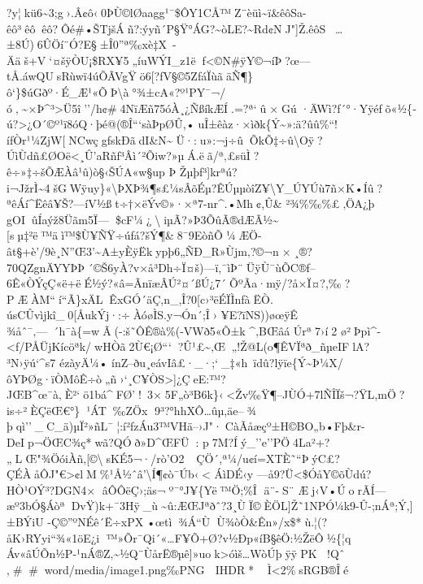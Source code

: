 ?y¦kü6\textasciitilde3;g›.Â¢ô‹0ÞÙ©l­Øaagg¹¯\$ÔY1CÅ™Z¨èüì\textasciitilde ï\&êôSa-êô³ êô\textbarêô?Ôé\#•ŠTjšÁñ?:ýyñ´P§Ÿ°ÁG?\textasciitilde òLE?\textasciitilde Rd¢NJ"{]}Ž.êôS\ldots±8Ú)6ÛÖí¨Ó?E§±Î0''ª‰xè‡X~-Ääš+V`¤šÿÒU¡\$RX¥5„íuWÝI\_z1ëf\textless©N\#ÿY©¬íÞ?œ---tÅ.áwQUsRù\textquotesingle wï4úÕÃVgŸö6{[}?ƒV§©5ZƒáÏùãäÑ¶\}ô`\}\$úGðº·É\_Æ¹«ÕÞ\textbackslash à°¾±\textbar cA«?º¹PY¯¬/ó‚\textasciitilde×Þ\^{}³\textgreater Ü5î''/h¢\#4NïÆñ75óÀ¸¿Ñ­ßík­ÆÍ.=?ª`û×Gú
·ÄWì?f´°·Yÿéƒõ«½\{­ú?\textgreater¿O´©º¹ï8óQ·þé@(®Î```sàÞpØÛ,•uÎ±êàz·×ìðk\{Ý\textasciitilde»:ä?ûû\%``!íƒÒr¹¼ZjW{[}NCwçgfskÐãdI\&N\textasciitildeÜ·:u»:¬j÷û­ÕkÕ‡÷û\textbackslash Oÿ?ÚìÙdñ£ØOë\textless¸Û'aRñƒ³Âì´²Õiw?»µÁ.ëã/ª‚ £süÌ?ê÷»‡÷šÕÆÀâ¹û)ò§‹ŠÚA«w§up
Þ
Žµþf³{]}krªú?i¬JžrÌ\textasciitilde4šGWÿuy\}«\textbackslash ÞXÞ¾¶s£¼s­ÂõÉµ­?ÊÚµµòîZ¥\textbackslash Y\_ÚYÚù7ñ×K•Íû?ªêÁí\^{}Ëêâ¥Š?---íV½ßt÷†×ëÝv©»·×ª7-nr\^{}.•Mh¢,Û\&
²¾\%‰\%£‚ÖA¿þ
gOIûÍaýž8Üãm5Ï---\$cF¼¿\textbackslashiµÃ?»Þ3ÕûÃ®dÆÃ½\textasciitilde{[}\textbar sµ‡²ë™äì™\$Ù¥ÑŸ÷úƒá?šÝ¶\&8¯9EòñÕ¼Æ­Ö-ât§+è'/9è¸N''Œ3'\textasciitilde A±yÈÿËkypþ6„ÑÐ\_R»Ùjm‚?©¬­­n×¸®?70QZgnÄYYÞÞ´©Š6yÀ?v×å³Dh÷Ï¤š)---ï,¯ìÞ¨ÜÿÙ¯ùÕC®f--6Ê«ÒÝçÇ«ë+ëÉ½ý?«â=ÃnïæÂÚ²¤´ßÚ¿7´ÕºÃa·mÿ/?å×Ï¤­?,‰?P\textquotesingle ÆÀM``í``Ã\}xÄLÊxGÓ´äÇ,n\_,Î?0{[}c›³ëÉÏÌnfàËÒ.
úsCÛvìjkî\_0{[}ÅukÝj·:÷\textquotesingleÀóøÌS.y¬Ón´;Î›¥E?ïN­S))øœÿÊ
¾åˆ¯‚---~´h¯à\{=wÃ(-:š˜ÔÊ®­à\%(-VWð5«Õ±k \^{}‚BŒâá Úrª7›í2
ø²Þpì\^{}­\textless ƒ/PÅÜjKícöªk/wHÒã2Ù€¡Ø``` ?Û¹ £\textasciitilde‚Œ„\textbar!Ž@L(o¶ÊVÏªð\_ñµeIFlA?³N›ÿú`\^{}s7
ézàyÄ¼•
ínZ--ðu¸eávIâ£·\_·;`\_‡\textbar«h~ïdû?lÿïe\{Ý\textasciitilde Þ¼X/ôYÞØg·ïÒMôÊ÷ò„ñ›`¸C¥ÒS\textgreater{]}¿ÇeE:™?JŒB\^{}œ¯à‚È²`ö1bá\^{}F\textbar Ø'!~3×5F„ò³B6k\}‹\textless Žv‰Ÿ¶--JÙÓ+7 lÑÎÏš¬?ŸL,m­Ö?is÷²ÈÇëŒ€°\}¹ÁT‰ZÖx
9³?°hhXÔ\ldots ûµ,äe--¾
þqì''\_ C\_ä)µÏ²»ñL¯¦:í²fzÁu3™VHä--›J"·CàÃåæçº±H©BO„b•F­þ\&r-DeIp¬ÖŒC¾ç*wã?QÓð»D\^{}ŒFÜ:
p7M?Íý\_''e''PÖ4La²+?„LŒ"¾ÖóiÀñ‚{[}©\textbackslashs\textbar KÉ5¬·/rò'O2~ÇÖ´,ª¼/u¢í=\textquotesingle XTÈ˜``ÞýC£?ÇÉÀåÔJ"€\textgreater¢lM\%¹Å½ˆâ'\textbackslash Í¶¢ò¯Úb‹\textless{}
ÁìDÉ‹y ---å9?Ü\textless\$ÓåY©õÙdú?HÒ¹OÝ³?DGN4× âÔÔëÇ›;äs¬º¯°J¥\{Yë™Ö­;\%Î
ä¨-S¨
Æj‹V•ÚorÃÍ---æº3bÓ§ÁòªDvŸ)k+¯3Hÿ\_ù\textasciitilde û:ÆŒJªðˆ?3¸ÙÏ©ÈÖL{]}Ž˜1NPÓ¼k9-Û-;nÁª;Ý‚{]}±­BÝiU
-Ç©''ºNÉê´Ë÷xPX•œtì¾Á``ÙÙ¾òÒ\&Ên»/x\$*ù.¦(?åK›RYyi``¾«1öE¿i
™»Õr¯Qi´«\ldots F¥Õ+Ø?v½Ðp«íB§êÖ:½ŽëÔ½\{¦q
Áv«âÚÕn½P-¹nÁ®Z‚\textasciitilde½Q¨ÙårË®µê{]}»uok\textgreater óìš\ldots WòÚþ  ÿÿ PK
       ! Qˆ ‚\# \#    word/media/image1.png‰PNG     IHDR  *      Ì\textless2\%   sRGB ®Îé   
